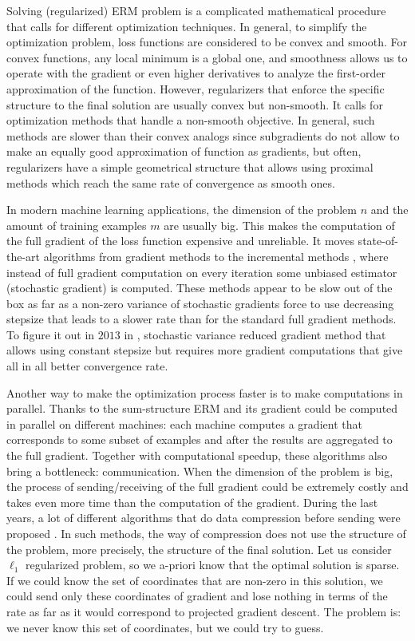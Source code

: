 Solving (regularized) ERM problem is a complicated mathematical procedure that calls for different optimization techniques. In general, to simplify the optimization problem, loss functions are considered to be convex and smooth. For convex functions, any local minimum is a global one, and smoothness allows us to operate with the gradient or even higher derivatives to analyze the first-order approximation of the function. However, regularizers that enforce the specific structure to the final solution are usually convex but non-smooth. It calls for optimization methods that  handle a non-smooth objective. In general, such methods are slower than their convex analogs since subgradients do not allow to make an equally good approximation of function as gradients, but often, regularizers have a simple geometrical structure that allows using proximal methods which reach the same rate of convergence as smooth ones.

In modern machine learning applications, the dimension of the problem $n$ and the amount of training examples $m$ are usually big. This makes the computation of the full gradient of the loss function expensive and unreliable. It moves state-of-the-art algorithms from gradient methods \cite{nesterov-book} to the incremental methods \cite{bertsekas2011incremental, bottou2010large}, where instead of full gradient computation on every iteration some unbiased estimator (stochastic gradient) is computed. These methods appear to be slow out of the box as far as a non-zero variance of stochastic gradients force to use decreasing stepsize that leads to a slower rate than for the standard full gradient methods. To figure it out in $2013$ in \cite{johnson2013accelerating}, stochastic variance reduced gradient method that allows using constant stepsize but requires more gradient computations that give all in all better convergence rate. 

Another way to make the optimization process faster is to make computations in parallel. Thanks to the sum-structure ERM and its gradient could be computed in parallel on different machines: each machine computes a gradient that corresponds to some subset of examples and after the results are aggregated to the full gradient. Together with computational speedup, these algorithms also bring a bottleneck: communication. When the dimension  of the problem is big, the process of sending/receiving of the full gradient could be extremely costly and takes even more time than the computation of the gradient. During the last years, a lot of different algorithms that do data compression before sending were proposed \cite{alistarh2017qsgd, wangni2018gradient, hubara2017quantized, wang2017efficient}. In such methods, the way of compression does not use the structure of the problem, more precisely, the structure of the final solution. Let us consider $\ell_1$ regularized problem, so we a-priori know that the optimal solution is sparse. If we could know the set of coordinates that are non-zero in this solution, we could send only these coordinates of gradient and lose nothing in terms of the rate as far as it would correspond to projected gradient descent. The problem is: we never know this set of coordinates, but we could try to guess. 

